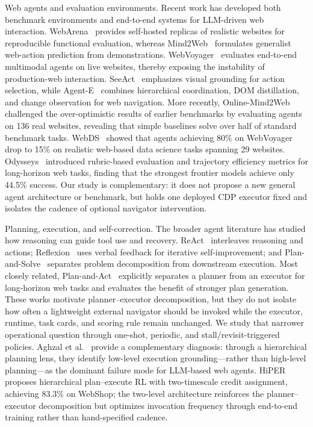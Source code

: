 \documentclass{llncs}
\begin{document}
Web agents and evaluation environments.
Recent work has developed both benchmark environments and end-to-end systems for
LLM-driven web interaction. WebArena~\cite{zhou2023webarena} provides
self-hosted replicas of realistic websites for reproducible functional evaluation,
whereas Mind2Web~\cite{deng2023mind2web} formulates generalist web-action
prediction from demonstrations. WebVoyager~\cite{he2024webvoyager} evaluates
end-to-end multimodal agents on live websites, thereby exposing the instability
of production-web interaction. SeeAct~\cite{zheng2024seeact} emphasizes visual
grounding for action selection, while Agent-E~\cite{emergence2024agente}
combines hierarchical coordination, DOM distillation, and change observation for
web navigation. More recently, Online-Mind2Web~\cite{xue2025illusion} challenged
the over-optimistic results of earlier benchmarks by evaluating agents on
136 real websites, revealing that simple baselines solve over half of standard
benchmark tasks. WebDS~\cite{hsu2026webds} showed that agents achieving 80\%
on WebVoyager drop to 15\% on realistic web-based data science tasks spanning
29 websites. Odysseys~\cite{jang2026odysseys} introduced rubric-based evaluation
and trajectory efficiency metrics for long-horizon web tasks, finding that the
strongest frontier models achieve only 44.5\% success.
Our study is complementary: it does not propose a new general
agent architecture or benchmark, but holds one deployed CDP executor fixed and
isolates the cadence of optional navigator intervention.

Planning, execution, and self-correction.
The broader agent literature has studied how reasoning can guide tool use and
recovery. ReAct~\cite{yao2023react} interleaves reasoning and actions;
Reflexion~\cite{shinn2023reflexion} uses verbal feedback for iterative
self-improvement; and Plan-and-Solve~\cite{wang2023planandsolve} separates
problem decomposition from downstream execution. Most closely related,
Plan-and-Act~\cite{erdogan2025planandact} explicitly separates a planner from
an executor for long-horizon web tasks and evaluates the benefit of stronger plan
generation. These works motivate planner--executor decomposition, but they do
not isolate how often a lightweight external navigator should be invoked while
the executor, runtime, task cards, and scoring rule remain unchanged. We study
that narrower operational question through one-shot, periodic, and
stall/revisit-triggered policies.
Aghzal et al.~\cite{aghzal2026webagentsfail} provide a complementary diagnosis:
through a hierarchical planning lens, they identify low-level execution
grounding---rather than high-level planning---as the dominant failure mode
for LLM-based web agents. HiPER~\cite{peng2026hiper} proposes hierarchical
plan--execute RL with two-timescale credit assignment, achieving 83.3\% on
WebShop; the two-level architecture reinforces the planner--executor
decomposition but optimizes invocation frequency through end-to-end training
rather than hand-specified cadence.
\end{document}
